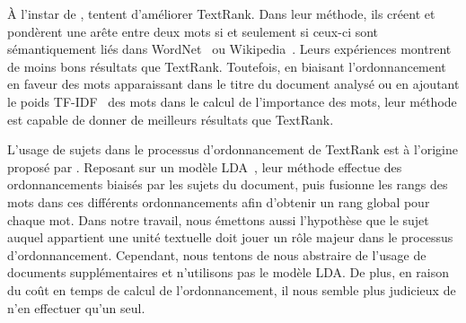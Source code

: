     À l'instar de ,
     tentent d'améliorer TextRank. Dans
    leur méthode, ils créent et pondèrent une arête entre deux mots si et
    seulement si ceux-ci sont sémantiquement liés dans
    WordNet~\cite{miller1995wordnet} ou
    Wikipedia~\cite{milne2008wikipediasemanticrelatedness}. Leurs expériences
    montrent de  moins bons résultats que TextRank. Toutefois, en biaisant l'ordonnancement
    en faveur des mots apparaissant dans le titre du document analysé ou en
    ajoutant le poids TF-IDF~\cite{jones1972tfidf} des mots dans le calcul de
    l'importance des mots, leur méthode est capable de donner de meilleurs
    résultats que TextRank.

    L'usage de sujets dans le processus d'ordonnancement de TextRank est à
    l'origine proposé par . Reposant sur un
    modèle LDA~\cite[Latent Dirichlet Allocation]{blei2003lda}, leur méthode
    effectue des ordonnancements biaisés par les sujets du document, puis
    fusionne les rangs des mots dans ces différents ordonnancements afin
    d'obtenir un rang global pour chaque mot. Dans notre travail, nous émettons
    aussi l'hypothèse que le sujet auquel appartient une unité textuelle doit
    jouer un rôle majeur dans le processus d'ordonnancement. Cependant, nous
    tentons de nous abstraire de l'usage de documents supplémentaires et
    n'utilisons pas le modèle LDA. De plus, en raison du coût en temps de calcul
    de l'ordonnancement, il nous semble plus judicieux de n'en effectuer qu'un
    seul.

